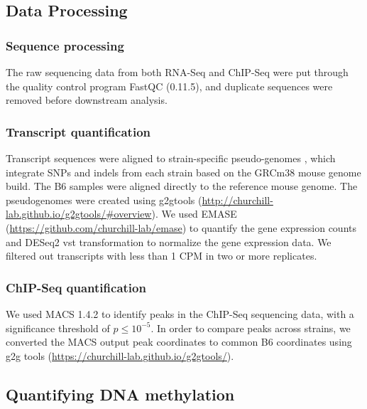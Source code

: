 \documentclass[
  11pt,
]{article}
\begin{document}
\hypertarget{data-processing}{%
\subsection{Data Processing}\label{data-processing}}

\hypertarget{sequence-processing}{%
\subsubsection{Sequence processing}\label{sequence-processing}}

The raw sequencing data from both RNA-Seq and ChIP-Seq were put through
the quality control program FastQC (0.11.5), and duplicate sequences
were removed before downstream analysis.

\hypertarget{transcript-quantification}{%
\subsubsection{Transcript
quantification}\label{transcript-quantification}}

Transcript sequences were aligned to strain-specific pseudo-genomes
\citep{pmid27309819}, which integrate SNPs and indels from each strain
based on the GRCm38 mouse genome build. The B6 samples were aligned
directly to the reference mouse genome. The pseudogenomes were created
using g2gtools
(\url{http://churchill-lab.github.io/g2gtools/\#overview}). We used
EMASE (\url{https://github.com/churchill-lab/emase}) to quantify the
gene expression counts and DESeq2 vst transformation
\citep{love2014moderated} to normalize the gene expression data. We
filtered out transcripts with less than 1 CPM in two or more replicates.

\hypertarget{chip-seq-quantification}{%
\subsubsection{ChIP-Seq quantification}\label{chip-seq-quantification}}

We used MACS 1.4.2 \citep{pmid18798982} to identify peaks in the
ChIP-Seq sequencing data, with a significance threshold of
\(p \leq 10^{-5}\). In order to compare peaks across strains, we
converted the MACS output peak coordinates to common B6 coordinates
using g2g tools (\url{https://churchill-lab.github.io/g2gtools/}).

\hypertarget{quantifying-dna-methylation}{%
\subsection{Quantifying DNA
methylation}\label{quantifying-dna-methylation}}
\end{document}
